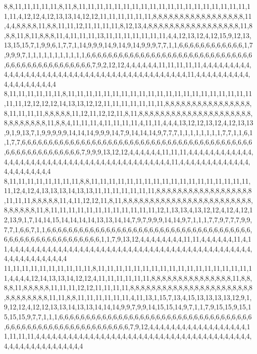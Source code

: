 8,8,11,11,11,11,11,8,11,8,11,11,11,11,11,11,11,11,11,11,11,11,11,11,11,11,11,11,11,11,11,4,12,12,4,12,13,13,14,12,12,11,11,11,11,11,11,8,8,8,8,8,8,8,8,8,8,8,8,8,8,8,8,8,11,4,4,8,8,8,8,11,8,8,11,11,12,11,11,11,11,8,12,13,4,8,8,8,8,8,8,8,8,8,8,8,8,8,8,8,8,8,11,8,8,8,11,8,11,8,8,8,11,4,11,11,11,13,11,11,11,11,11,11,11,4,4,12,13,12,4,12,15,9,12,13,13,15,15,7,1,9,9,6,1,7,7,1,14,9,9,9,14,9,14,9,14,9,9,9,7,7,1,1,6,6,6,6,6,6,6,6,6,6,6,6,1,7,9,9,9,7,1,1,1,1,1,1,1,1,1,1,1,6,6,6,6,6,6,6,6,6,6,6,6,6,6,6,6,6,6,6,6,6,6,6,6,6,6,6,6,6,6,6,6,6,6,6,6,6,6,6,6,6,6,6,6,6,6,6,7,9,2,12,12,4,4,4,4,4,4,11,11,11,11,11,4,4,4,4,4,4,4,4,4,4,4,4,4,4,4,4,4,4,4,4,4,4,4,4,4,4,4,4,4,4,4,4,4,4,4,4,4,4,4,4,4,4,4,11,4,4,4,4,4,4,4,4,4,4,4,4,4,4,4,4,4,4,4,4
8,11,11,11,11,11,11,8,11,11,11,11,11,11,11,11,11,11,11,11,11,11,11,11,11,11,11,11,11,11,11,12,12,12,12,14,13,13,12,12,11,11,11,11,11,11,11,8,8,8,8,8,8,8,8,8,8,8,8,8,8,8,8,8,11,11,11,11,8,8,8,8,8,11,12,11,12,12,11,8,11,8,8,8,8,8,8,8,8,8,8,8,8,8,8,8,8,8,8,8,8,8,8,8,8,8,8,8,8,8,11,8,8,4,11,11,11,4,11,11,11,11,4,11,11,4,4,4,13,12,12,13,12,4,12,13,13,9,1,9,13,7,1,9,9,9,9,9,14,14,14,9,9,9,14,7,9,14,14,14,9,7,7,7,1,1,1,1,1,1,1,1,7,7,1,1,6,1,1,7,7,6,6,6,6,6,6,6,6,6,6,6,6,6,6,6,6,6,6,6,6,6,6,6,6,6,6,6,6,6,6,6,6,6,6,6,6,6,6,6,6,6,6,6,6,6,6,6,6,6,6,6,6,6,6,6,6,6,7,9,9,9,13,12,12,4,4,4,4,4,4,11,11,11,4,4,4,4,4,4,4,4,4,4,4,4,4,4,4,4,4,4,4,4,4,4,4,4,4,4,4,4,4,4,4,4,4,4,4,4,4,4,4,4,4,4,4,11,4,4,4,4,4,4,4,4,4,4,4,4,4,4,4,4,4,4,4,4,4,4
8,11,11,11,11,11,11,11,11,8,8,11,11,11,11,11,11,11,11,11,11,11,11,11,11,11,11,11,11,11,12,4,12,4,13,13,13,14,13,13,11,11,11,11,11,11,11,8,8,8,8,8,8,8,8,8,8,8,8,8,8,8,8,8,8,11,11,11,8,8,8,8,8,11,4,11,12,12,11,8,11,8,8,8,8,8,8,8,8,8,8,8,8,8,8,8,8,8,8,8,8,8,8,8,8,8,8,8,8,8,8,11,8,11,11,11,11,11,11,11,11,11,11,11,11,12,1,13,13,4,13,12,12,4,12,4,12,12,13,9,1,7,14,14,15,14,14,14,14,13,13,14,14,7,9,7,9,9,9,14,14,9,7,1,1,1,7,7,9,7,7,7,9,9,7,7,1,6,6,7,1,1,6,6,6,6,6,6,6,6,6,6,6,6,6,6,6,6,6,6,6,6,6,6,6,6,6,6,6,6,6,6,6,6,6,6,6,6,6,6,6,6,6,6,6,6,6,6,6,6,6,6,6,6,6,6,6,6,1,1,7,9,13,12,4,4,4,4,4,4,4,4,11,11,4,4,4,4,4,4,11,4,11,4,4,4,4,4,4,4,4,4,4,4,4,4,4,4,4,4,4,4,4,4,4,4,4,4,4,4,4,4,4,4,4,4,4,4,4,4,4,4,4,4,4,4,4,4,4,4,4,4,4,4,4,4,4,4,4,4
11,11,11,11,11,11,11,11,11,11,8,11,11,11,11,11,11,11,11,11,11,11,11,11,11,11,11,11,11,4,4,4,4,12,14,13,13,14,12,12,4,11,11,11,11,11,11,8,8,8,8,8,8,8,8,8,8,8,8,8,8,8,11,8,8,8,8,11,8,8,8,8,8,11,11,11,12,12,11,11,11,11,8,8,8,8,8,8,8,8,8,8,8,8,8,8,8,8,8,8,8,8,8,8,8,8,8,8,8,8,8,8,8,11,11,8,8,11,11,11,11,11,11,4,11,13,1,15,7,13,4,15,13,13,13,13,12,9,1,9,12,12,4,12,12,13,13,14,13,13,14,14,14,9,9,7,9,9,14,15,15,14,9,7,1,1,7,9,15,15,9,15,15,15,15,9,7,7,1,1,1,6,6,6,6,6,6,6,6,6,6,6,6,6,6,6,6,6,6,6,6,6,6,6,6,6,6,6,6,6,6,6,6,6,6,6,6,6,6,6,6,6,6,6,6,6,6,6,6,6,6,6,6,6,6,6,6,6,6,6,7,9,12,4,4,4,4,4,4,4,4,4,4,4,4,4,4,4,4,4,4,11,11,11,11,4,4,4,4,4,4,4,4,4,4,4,4,4,4,4,4,4,4,4,4,4,4,4,4,4,4,4,4,4,4,4,4,4,4,4,4,4,4,4,4,4,4,4,4,4,4,4,4,4,4,4,4,4,4,4
